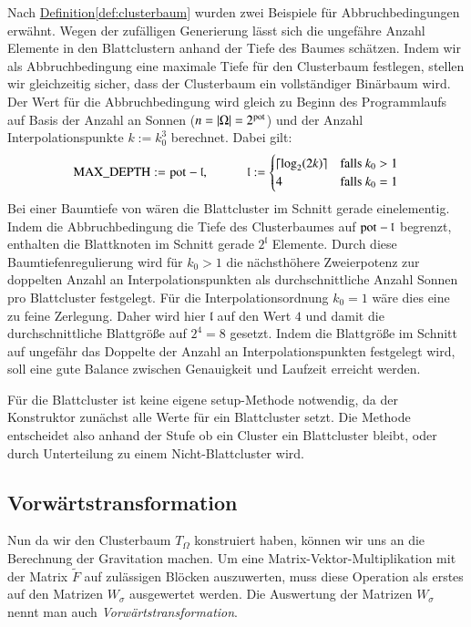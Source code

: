     Nach \hyperref[def:clusterbaum]{Definition}\autoref{def:clusterbaum} wurden zwei Beispiele für Abbruchbedingungen erwähnt. Wegen der zufälligen Generierung lässt sich die ungefähre Anzahl Elemente
    in den Blattclustern anhand der Tiefe des Baumes schätzen. Indem wir als Abbruchbedingung eine maximale Tiefe für den Clusterbaum festlegen, stellen wir gleichzeitig sicher, dass der Clusterbaum
    ein vollständiger Binärbaum wird.
    Der Wert  für die Abbruchbedingung wird gleich zu Beginn des Programmlaufs auf Basis der Anzahl an Sonnen ($n =|\Omega| = 2^{\tcode{pot}}$) und der Anzahl Interpolationspunkte
    $k := k_0^3$ berechnet. Dabei gilt:
    \begin{equation}
      \tcode{MAX\_DEPTH} := \tcode{pot} - \mathfrak{l}, \ \ \ \ \ \ \ \ \ \ \ \ 
      \mathfrak{l} :=
      \begin{cases}
	\lceil \log_2(2 k) \rceil & \text{falls } k_0 > 1\\
	4			  & \text{falls } k_0 = 1
      \end{cases}
      \label{eq:l}
    \end{equation}
    Bei einer Baumtiefe von  wären die Blattcluster im Schnitt gerade einelementig. Indem die Abbruchbedingung die Tiefe des Clusterbaumes auf $\tcode{pot} - \mathfrak{l}$ begrenzt,
    enthalten die Blattknoten im Schnitt gerade $2^\mathfrak{l}$ Elemente.
    Durch diese Baumtiefenregulierung wird für $k_0 > 1$ die nächsthöhere Zweierpotenz zur doppelten Anzahl an Interpolationspunkten als durchschnittliche Anzahl Sonnen pro Blattcluster festgelegt. 
    Für die Interpolationsordnung $k_0 = 1$ wäre dies eine zu feine Zerlegung. Daher wird hier $\mathfrak{l}$  auf den Wert $4$ und damit die durchschnittliche Blattgröße auf $2^4 = 8$ gesetzt.
    Indem die Blattgröße im Schnitt auf ungefähr das Doppelte der Anzahl an Interpolationspunkten festgelegt wird, soll eine gute Balance zwischen Genauigkeit und Laufzeit erreicht werden.
        
    Für die Blattcluster ist keine eigene setup-Methode notwendig, da der Konstruktor \mbox{} zunächst alle Werte für ein Blattcluster setzt. Die Methode \linebreak
    \mbox{\code{\_setup(...)}} entscheidet also anhand der Stufe ob ein Cluster ein Blattcluster bleibt, oder durch Unterteilung zu einem Nicht-Blattcluster wird.

    \subsection{Vorwärtstransformation}
    \label{sec:vorw}
    
    Nun da wir den Clusterbaum $T_\Omega$ konstruiert haben, können wir uns an die Berechnung der Gravitation machen.
    Um eine Matrix-Vektor-Multiplikation mit der Matrix $\tilde F$ auf zulässigen Blöcken auszuwerten, muss diese Operation als erstes auf den Matrizen $W_\sigma$ ausgewertet werden.
    Die Auswertung der Matrizen $W_\sigma$ nennt man auch \textit{Vorwärtstransformation}.
    
